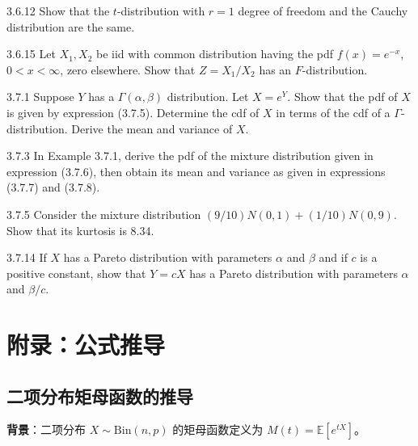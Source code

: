 \begin{exercise}{3.6.12}
Show that the $t$-distribution with $r = 1$ degree of freedom and the Cauchy distribution are the same.
\end{exercise}

\begin{exercise}{3.6.15}
Let $X_1, X_2$ be iid with common distribution having the pdf $f(x) = e^{-x}$, $0 < x < \infty$, zero elsewhere. Show that $Z = X_1/X_2$ has an $F$-distribution.
\end{exercise}

\begin{exercise}{3.7.1}
Suppose $Y$ has a $\Gamma(\alpha, \beta)$ distribution. Let $X = e^Y$. Show that the pdf of $X$ is given by expression (3.7.5). Determine the cdf of $X$ in terms of the cdf of a $\Gamma$-distribution. Derive the mean and variance of $X$.
\end{exercise}

\begin{exercise}{3.7.3}
In Example 3.7.1, derive the pdf of the mixture distribution given in expression (3.7.6), then obtain its mean and variance as given in expressions (3.7.7) and (3.7.8).
\end{exercise}

\begin{exercise}{3.7.5}
Consider the mixture distribution $(9/10)N(0,1) + (1/10)N(0,9)$. Show that its kurtosis is 8.34.
\end{exercise}

\begin{exercise}{3.7.14}
If $X$ has a Pareto distribution with parameters $\alpha$ and $\beta$ and if $c$ is a positive constant, show that $Y = cX$ has a Pareto distribution with parameters $\alpha$ and $\beta/c$.
\end{exercise}

\section{附录：公式推导}\label{sec:appendix-ch3}

\subsection{二项分布矩母函数的推导}\label{sec:derivation-binomial-moments}

\textbf{背景}：二项分布 $X \sim \text{Bin}(n, p)$ 的矩母函数定义为 $M(t) = \mathbb{E}[e^{tX}]$。

